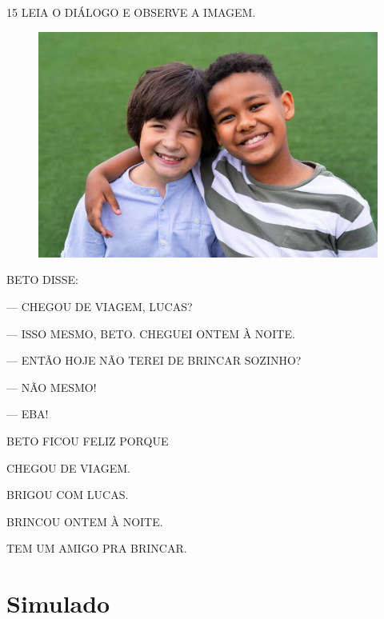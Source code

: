 \num{15} LEIA O DIÁLOGO E OBSERVE A IMAGEM.

\begin{figure}[H]
\centering
\includegraphics[width=\textwidth]{media/image220b.png}
\end{figure}

\begin{myquote}
BETO DISSE:

--- CHEGOU DE VIAGEM, LUCAS?

--- ISSO MESMO, BETO. CHEGUEI ONTEM À NOITE.

--- ENTÃO HOJE NÃO TEREI DE BRINCAR SOZINHO?

--- NÃO MESMO!

--- EBA!
\end{myquote}

BETO FICOU FELIZ PORQUE

\begin{escolha}
\item CHEGOU DE VIAGEM.

\item BRIGOU COM LUCAS.

\item BRINCOU ONTEM À NOITE.

\item TEM UM AMIGO PRA BRINCAR.
\end{escolha}



\chapter[Simulado 3]{Simulado}

\pagebreak

